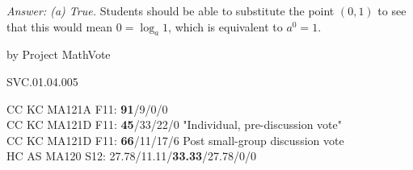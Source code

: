 {\it Answer:  (a)  True.}  Students should be able to substitute the point $(0,1)$ to see that this would mean $0=\log_a 1$, which is equivalent to $a^0=1$.

\medskip

by Project MathVote

SVC.01.04.005

CC KC MA121A F11: {\bf 91}/9/0/0  \\
CC KC MA121D F11: {\bf 45}/33/22/0 "Individual, pre-discussion vote" \\
CC KC MA121D F11: {\bf 66}/11/17/6 Post small-group discussion vote \\
HC AS MA120 S12: 27.78/11.11/{\bf33.33}/27.78/0/0  \\
